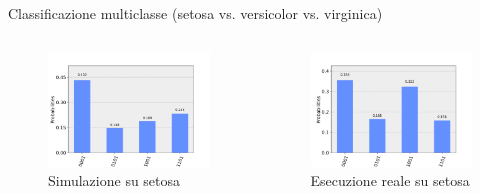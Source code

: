 \documentclass{beamer}
\begin{document}
    \begin{frame}{Classificazione multiclasse (setosa vs. versicolor vs. virginica)}
        \begin{columns}
            \begin{figure}[h]
                \centering
                \includegraphics[width=\textwidth]{gfx/setosa_simulato_multiclasse.png}
                \caption{Simulazione su setosa}
                \label{fig:simulazione.multi.setosa}
            \end{figure}
            \begin{figure}[h]
                \centering
                \includegraphics[width=\textwidth]{gfx/setosa_reale_20190913:1716.png}
                \caption{Esecuzione reale su setosa}
                \label{fig:esecuzione.multi.setosa}
            \end{figure}
        \end{columns}
    \end{frame}
\end{document}
